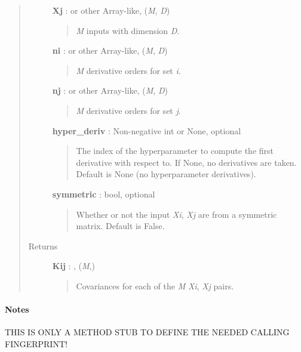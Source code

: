 \documentclass[letterpaper,10pt,english]{sphinxmanual}
\begin{document}
\begin{fulllineitems}
\begin{fulllineitems}
\begin{quote}
\begin{description}
\textbf{Xj} :  or other Array-like, (\emph{M}, \emph{D})
\begin{quote}

\emph{M} inputs with dimension \emph{D}.
\end{quote}

\textbf{ni} :  or other Array-like, (\emph{M}, \emph{D})
\begin{quote}

\emph{M} derivative orders for set \emph{i}.
\end{quote}

\textbf{nj} :  or other Array-like, (\emph{M}, \emph{D})
\begin{quote}

\emph{M} derivative orders for set \emph{j}.
\end{quote}

\textbf{hyper\_deriv} : Non-negative int or None, optional
\begin{quote}

The index of the hyperparameter to compute the first derivative
with respect to. If None, no derivatives are taken. Default is None
(no hyperparameter derivatives).
\end{quote}

\textbf{symmetric} : bool, optional
\begin{quote}

Whether or not the input \emph{Xi}, \emph{Xj} are from a symmetric matrix.
Default is False.
\end{quote}

\item[{Returns}] \leavevmode
\textbf{Kij} : , (\emph{M},)
\begin{quote}

Covariances for each of the \emph{M} \emph{Xi}, \emph{Xj} pairs.
\end{quote}

\end{description}\end{quote}
\paragraph{Notes}

THIS IS ONLY A METHOD STUB TO DEFINE THE NEEDED CALLING FINGERPRINT!

\end{fulllineitems}



\end{fulllineitems}
\end{document}
